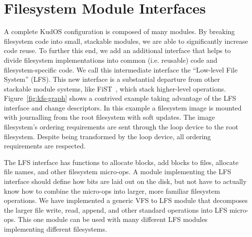 \preparagraphspacing{}
\section*{Filesystem Module Interfaces}
\label{sec:interfaces}

A complete KudOS configuration is composed of many modules.
By breaking filesystem code into
small, stackable modules, we are able to significantly increase code reuse. To
further this end, we add an additional interface that helps to divide filesystem
implementations into common (i.e. reusable) code and filesystem-specific code.
We call this intermediate interface the ``Low-level File System'' (LFS). This
new interface is a substantial departure from other stackable module systems,
like FiST~\cite{zadok00fist}, which stack higher-level operations.
%
Figure~\ref{fig:kfs-graph} shows a contrived example taking advantage
of the LFS interface and change descriptors. In this example a
filesystem image is mounted with journalling from the root filesystem
with soft updates. The image filesystem's ordering requirements are
sent through the loop device to the root filesystem. Despite being
transformed by the loop device, all ordering requirements are respected.

The LFS interface has functions to allocate blocks, add blocks to
files, allocate file names, and other filesystem micro-ops. A module
implementing the LFS interface should define how bits are laid out on
the disk, but not have to actually know how to combine the micro-ops
into larger, more familiar filesystem operations. We have implemented
a generic VFS to LFS module that decomposes the larger file write,
read, append, and other standard operations into LFS micro-ops. This
one module can be used with many different LFS modules implementing
different filesystems.
